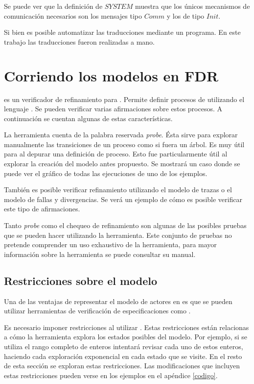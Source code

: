 Se puede ver que la definición de $SYSTEM$ muestra que los únicos mecanismos de comunicación necesarios son los mensajes tipo $Comm$ y los de tipo $Init$. 

Si bien es posible automatizar las traducciones mediante un programa. En este trabajo las traducciones fueron realizadas a mano.

\section{Corriendo los modelos en FDR}

\FDR es un verificador de refinamiento para \CSP. Permite definir procesos de \CSP utilizando el lenguaje \CSPm. Se pueden verificar varias afirmaciones sobre estos procesos. A continuación se cuentan algunas de estas características.

La herramienta cuenta de la palabra reservada \textit{probe}. Ésta sirve para explorar manualmente las transiciones de un proceso como si fuera un árbol. Es muy útil para al depurar una definición de proceso. Esto fue particularmente útil al explorar la creación del modelo antes propuesto. Se mostrará un caso donde se puede ver el gráfico de todas las ejecuciones de uno de los ejemplos. 
 
También es posible verificar refinamiento utilizando el modelo de trazas o el modelo de fallas y divergencias. Se verá un ejemplo de cómo es posible verificar este tipo de afirmaciones.

Tanto \textit{probe} como el chequeo de refinamiento son algunas de las posibles pruebas que se pueden hacer utilizando la herramienta. Este conjunto de pruebas no pretende comprender un uso exhaustivo de la herramienta, para mayor información sobre la herramienta se puede consultar su manual\cite{fdrmanual}.

\subsection{Restricciones sobre el modelo}
Una de las ventajas de representar el modelo de actores en \CSP es que se pueden utilizar herramientas de verificación de especificaciones \CSP como \FDR.

Es necesario imponer restricciones al utilizar \FDR. Estas restricciones están relacionas a cómo la herramienta explora los estados posibles del modelo. Por ejemplo, si se utiliza el rango completo de enteros intentará revisar cada uno de estos enteros, haciendo cada exploración exponencial en cada estado que se visite. En el resto de esta sección se exploran estas restricciones. Las modificaciones que incluyen estas restricciones pueden verse en los ejemplos en el apéndice \ref{codigo}.

